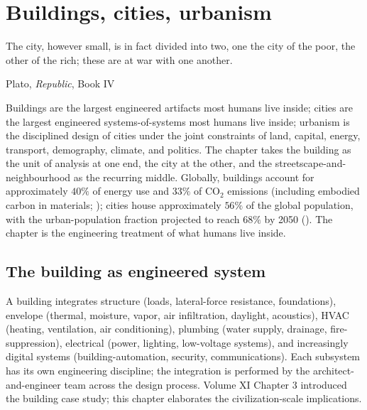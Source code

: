 \chapter{Buildings, cities, urbanism}
\label{vol12:ch07}

\epigraph{The city, however small, is in fact divided into two, one the city of the poor, the other of the rich; these are at war with one another.}{Plato, \emph{Republic}, Book IV}


\noindent
Buildings are the largest engineered artifacts most humans live inside; cities are the largest engineered systems-of-systems most humans live inside; urbanism is the disciplined design of cities under the joint constraints of land, capital, energy, transport, demography, climate, and politics. The chapter takes the building as the unit of analysis at one end, the city at the other, and the streetscape-and-neighbourhood as the recurring middle. Globally, buildings account for approximately $40\%$ of energy use and $33\%$ of CO$_2$ emissions (including embodied carbon in materials; \cite{web:globalabc-status-2023}); cities house approximately $56\%$ of the global population, with the urban-population fraction projected to reach $68\%$ by 2050 (\cite{web:un-wup-2018}). The chapter is the engineering treatment of what humans live inside.

\section{The building as engineered system}

A building integrates structure (loads, lateral-force resistance, foundations), envelope (thermal, moisture, vapor, air infiltration, daylight, acoustics), HVAC (heating, ventilation, air conditioning), plumbing (water supply, drainage, fire-suppression), electrical (power, lighting, low-voltage systems), and increasingly digital systems (building-automation, security, communications). Each subsystem has its own engineering discipline; the integration is performed by the architect-and-engineer team across the design process. Volume XI Chapter 3 introduced the building case study; this chapter elaborates the civilization-scale implications.

